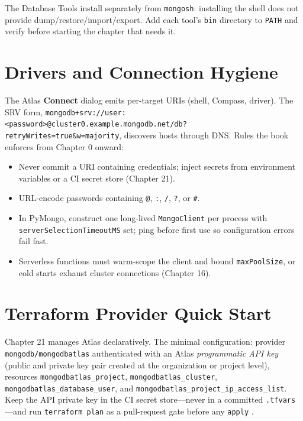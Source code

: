 \noindent The Database Tools install separately from \texttt{mongosh}: installing the shell does
not provide dump/restore/import/export. Add each tool's \texttt{bin} directory to \texttt{PATH}
and verify before starting the chapter that needs it.

\section{Drivers and Connection Hygiene}
%
The Atlas \textbf{Connect} dialog emits per-target URIs (shell, Compass, driver). The SRV form,
\texttt{mongodb+srv://user:<password>@cluster0.example.mongodb.net/db?retryWrites=true\&w=majority},
discovers hosts through DNS. Rules the book enforces from Chapter 0 onward:

\begin{itemize}
    \item Never commit a URI containing credentials; inject secrets from environment variables or a CI secret store (Chapter 21).
    \item URL-encode passwords containing \texttt{@}, \texttt{:}, \texttt{/}, \texttt{?}, or \texttt{\#}.
    \item In PyMongo, construct one long-lived \texttt{MongoClient} per process with \texttt{serverSelectionTimeoutMS} set; ping before first use so configuration errors fail fast.
    \item Serverless functions must warm-scope the client and bound \texttt{maxPoolSize}, or cold starts exhaust cluster connections (Chapter 16).
\end{itemize}

\section{Terraform Provider Quick Start}
%
Chapter 21 manages Atlas declaratively. The minimal configuration: provider
\texttt{mongodb/mongodbatlas} authenticated with an Atlas \emph{programmatic API key} (public and
private key pair created at the organization or project level), resources
\texttt{mongodbatlas\_project}, \texttt{mongodbatlas\_cluster},
\texttt{mongodbatlas\_database\_user}, and \texttt{mongodbatlas\_project\_ip\_access\_list}. Keep
the API private key in the CI secret store---never in a committed \texttt{.tfvars}---and run
\texttt{terraform plan} as a pull-request gate before any \texttt{apply}
\cite{mongodbTerraformDocs,terraformDocs}.

